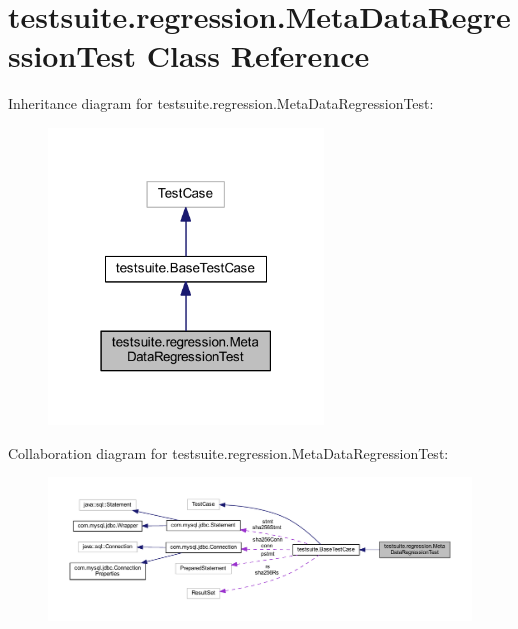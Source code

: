 \hypertarget{classtestsuite_1_1regression_1_1_meta_data_regression_test}{}\section{testsuite.\+regression.\+Meta\+Data\+Regression\+Test Class Reference}
\label{classtestsuite_1_1regression_1_1_meta_data_regression_test}


Inheritance diagram for testsuite.\+regression.\+Meta\+Data\+Regression\+Test\+:
\nopagebreak
\begin{figure}[H]
\begin{center}
\leavevmode
\includegraphics[width=207pt]{classtestsuite_1_1regression_1_1_meta_data_regression_test__inherit__graph}
\end{center}
\end{figure}


Collaboration diagram for testsuite.\+regression.\+Meta\+Data\+Regression\+Test\+:
\nopagebreak
\begin{figure}[H]
\begin{center}
\leavevmode
\includegraphics[width=350pt]{classtestsuite_1_1regression_1_1_meta_data_regression_test__coll__graph}
\end{center}
\end{figure}
